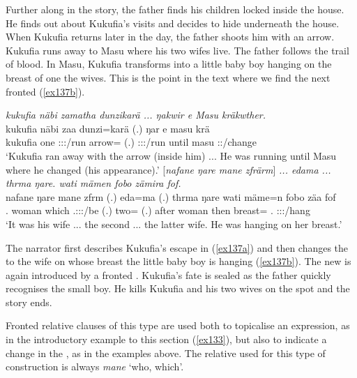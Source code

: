 Further along in the story, the father finds his children locked inside the house. He finds out about Kukufia's visits and decides to hide underneath the house. When Kukufia returns later in the day, the father shoots him with an arrow. Kukufia runs away to Masu where his two wifes live. The father follows the trail of blood. In Masu, Kukufia transforms into a little baby boy hanging on the breast of one the wives. This is the point in the text where we find the next fronted  (\ref{ex137b}).

\begin{exe}
	\ex \label{ex137}
	\begin{xlist}
	\ex \label{ex137a}
	\emph{kukufia näbi zamatha dunzikarä ... ŋakwir e Masu kräkwther.}\\
	\gll kukufia näbi zaa dunzi=karä (.) ŋar e masu krä\\
	kukufia one \Tsg:\Sbj:\Pst:\Pfv/run arrow={\Prop} (.) \Tsg:\Sbj:\Nonpast:\Ipfv/run until masu \Tsg:\Irr:\Pfv/change \\
	\trans `Kukufia ran away with the arrow (inside him) ... He was running until Masu where he changed (his appearance).'
	\ex \label{ex137b} {[\emph{nafane ŋare mane zfrärm}] \emph{... edama ... thrma ŋare. wati mämen fobo zämira fof.}}\\
	\gll nafane ŋare mane zfrm (.) eda=ma (.) thrma ŋare wati mäme=n fobo zäa fof\\
	\Tsg.{\Poss} woman which \Tsg.\F:\Sbj:\Pst:\Dur/be (.) two={\Char} (.) after woman then breast={\Loc} \Dist.{\All} \Stsg:\Sbj:\Pst:\Pfv/hang {\Emph}\\
	\trans `It was his wife ... the second ... the latter wife. He was hanging on her breast.'\\
	\end{xlist}
\end{exe}

The narrator first describes Kukufia's escape in (\ref{ex137a}) and then changes the  to the wife on whose breast the little baby boy is hanging (\ref{ex137b}). The new  is again introduced by a fronted . Kukufia's fate is sealed as the father quickly recognises the small boy. He kills Kukufia and his two wives on the spot and the story ends.

Fronted relative clauses of this type are used both to topicalise an expression, as in the introductory example to this section (\ref{ex133}), but also to indicate a change in the , as in the examples above. The relative  used for this type of construction is always \emph{mane} `who, which'.

